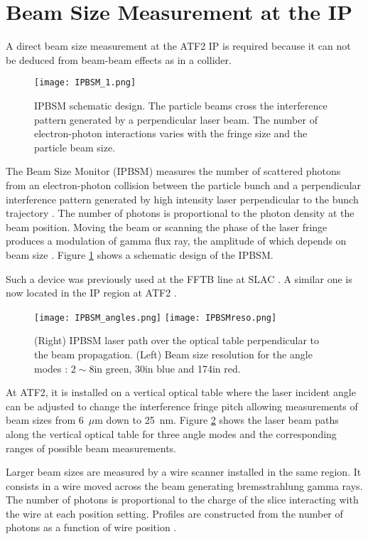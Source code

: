 {{\section{Beam Size Measurement at the IP}
A direct beam size measurement at the ATF2 IP is required because it can not be deduced from beam-beam effects as in a collider.\par
\begin{figure}[htb]
 \begin{center}
  \texttt{[image: IPBSM\_1.png]}\caption{IPBSM schematic design. The particle beams cross the interference pattern generated by a perpendicular laser beam. The number of electron-photon interactions varies with the fringe size and the particle beam size.}\label{f:IPBSM}
 \end{center}
\end{figure}
The Beam Size Monitor (IPBSM) measures the number of scattered photons from an electron-photon collision between the particle bunch and a perpendicular interference pattern generated by high intensity laser perpendicular to the bunch trajectory \cite{Shintake1992453}. The number of photons is proportional to the photon density at the beam position. Moving the beam or scanning the phase of the laser fringe produces a modulation of gamma flux ray, the amplitude of which depends on beam size \cite{Yves}. Figure \ref{f:IPBSM} shows a schematic design of the IPBSM.\par
Such a device was previously used at the FFTB line at SLAC \cite{Shintake:1995sg}. A similar one is now located in the IP region at ATF2 \cite{Jackelinethese}.\par
\begin{figure}[htb]
 \begin{center}
  \texttt{[image: IPBSM\_angles.png]}
  \texttt{[image: IPBSMreso.png]}
  \caption{(Right) IPBSM laser path over the optical table perpendicular to the beam propagation. (Left) Beam size resolution for the angle modes : $2\sim8$\degree in green, 30\degree in blue and 174\degree in red.}\label{f:IPBSMangles}
 \end{center}
\end{figure}
At ATF2, it is installed on a vertical optical table where the laser incident angle can be adjusted to change the interference fringe pitch allowing measurements of beam sizes from 6~$\mu$m down to 25~nm. Figure \ref{f:IPBSMangles} shows the laser beam paths along the vertical optical table for three angle modes and the corresponding ranges of possible beam measurements.\par
Larger beam sizes are measured by a wire scanner installed in the same region. It consists in a wire moved across the beam generating bremsstrahlung gamma rays. The number of photons is proportional to the charge of the slice interacting with the wire at each position setting. Profiles are constructed from the number of photons as a function of wire position \cite{Hayano:2000xf}.

}}
